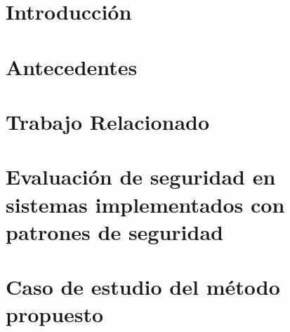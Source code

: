 \documentclass[12pt,spanish]{book}
\begin{document}


\chapter{Introducción}


\chapter{Antecedentes}

\label{ch:antecedentes}

\chapter{Trabajo Relacionado}




\chapter{Evaluación de seguridad en sistemas implementados con patrones de seguridad}


\chapter{Caso de estudio del método propuesto}

\end{document}
